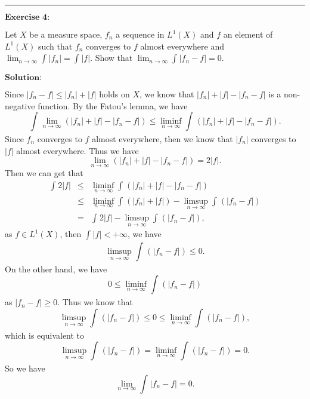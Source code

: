 \documentclass[12pt]{article}
\begin{document}
\vspace{8pt}

\noindent\rule[0.25\baselineskip]{\textwidth}{0.5pt}

$\textbf{Exercise 4:}$

Let $X$ be a measure space, $f_{n}$ a sequence in $L^{1} (X)$ and $f$ an element of $L^{1}(X)$ such that $f_{n}$ converges to $f$ almost everywhere and $\lim_{n \to \infty} \int_{}^{} |f_{n}| = \int_{}^{} |f|$. Show that $\lim_{n \to \infty} \int_{}^{} |f_{n} - f| = 0$.

\vspace{8pt}
$\textbf{Solution:}$

Since $|f_{n} - f| \leq |f_{n}| + |f|$ holds on $X$, we know that $|f_{n}| + |f| - |f_{n} - f|$ is a non-negative function. By the Fatou's lemma, we have
\begin{equation*}
    \int_{}^{} \lim_{n \to \infty} (|f_{n}| + |f| - |f_{n} - f|)  \leq \liminf_{n \to \infty} \int_{}^{} (|f_{n}| + |f| - |f_{n} - f|).
\end{equation*}
Since $f_{n}$ converges to $f$ almost everywhere, then we know that $|f_{n}|$ converges to $|f|$ almost everywhere. Thus we have
\begin{equation*}
    \lim_{n \to \infty} (|f_{n}| + |f| - |f_{n} - f|) = 2 |f|.
\end{equation*}
Then we can get that
\begin{eqnarray*}
\int_{}^{} 2 |f| & \leq & \liminf_{n \to \infty} \int_{}^{} (|f_{n}| + |f| - |f_{n} - f|) \\
& \leq & \liminf_{n \to \infty} \int_{}^{} (|f_{n}| + |f|) - \limsup_{n \to \infty}  \int_{}^{} (|f_{n} - f|) \\
& = & \int_{}^{} 2 |f| - \limsup_{n \to \infty}  \int_{}^{} (|f_{n} - f|),
\end{eqnarray*}
as $f \in L^{1}(X)$, then $\int_{}^{} |f| < + \infty$, we have
\begin{equation*}
    \limsup_{n \to \infty}  \int_{}^{} (|f_{n} - f|) \leq 0.
\end{equation*}
On the other hand, we have
\begin{equation*}
    0 \leq \liminf_{n \to \infty}  \int_{}^{} (|f_{n} - f|)
\end{equation*}
as $|f_{n} - f| \geq 0$. Thus we know that
\begin{equation*}
    \limsup_{n \to \infty}  \int_{}^{} (|f_{n} - f|) \leq 0 \leq \liminf_{n \to \infty}  \int_{}^{} (|f_{n} - f|),
\end{equation*}
which is equivalent to
\begin{equation*}
    \limsup_{n \to \infty}  \int_{}^{} (|f_{n} - f|) = \liminf_{n \to \infty}  \int_{}^{} (|f_{n} - f|) = 0.
\end{equation*}
So we have
\begin{equation*}
    \lim_{n \to \infty} \int_{}^{} |f_{n} - f| = 0.
\end{equation*}
\end{document}
